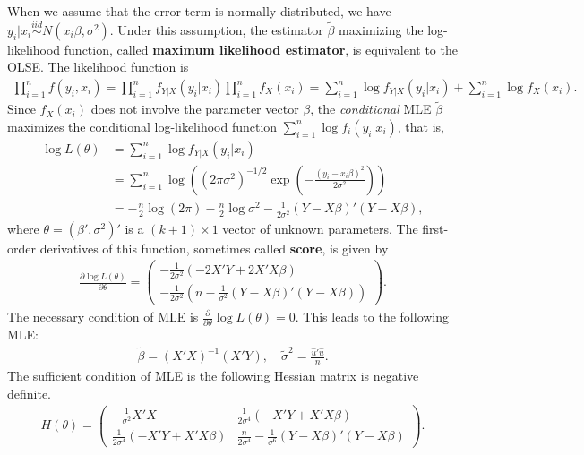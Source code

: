 \documentclass[
  12pt,
]{article}
\begin{document}
When we assume that the error term is normally distributed, we have \(y_i | x_i \overset{iid}{\sim} N(x_i \beta, \sigma^2)\).
Under this assumption, the estimator \(\tilde{\beta}\) maximizing the log-likelihood function, called \textbf{maximum likelihood estimator},
is equivalent to the OLSE.
The likelihood function is
\begin{align*}
  \prod_{i=1}^n f(y_i, x_i)
  = \prod_{i=1}^n f_{Y|X}(y_i | x_i) \prod_{i=1}^n f_X(x_i)
  = \sum_{i=1}^n \log f_{Y|X}(y_i | x_i) + \sum_{i=1}^n \log f_X(x_i).
\end{align*}
Since \(f_X(x_i)\) does not involve the parameter vector \(\beta\),
the \emph{conditional} MLE \(\tilde{\beta}\) maximizes the conditional log-likelihood function \(\sum_{i=1}^n \log f_i(y_i | x_i)\), that is,
\begin{align*}
  \log L(\theta) 
  &= \sum_{i=1}^n \log f_{Y|X}(y_i | x_i)  \\
  &= \sum_{i=1}^n \log \left( (2\pi\sigma^2)^{-1/2} \exp\left( -\frac{(y_i - x_i \beta)^2}{2\sigma^2} \right) \right)  \\
  &= -\frac{n}{2} \log (2\pi) -\frac{n}{2}\log\sigma^2 -\frac{1}{2\sigma^2} (Y - X \beta)'(Y - X \beta),
\end{align*}
where \(\theta = (\beta', \sigma^2)'\) is a \((k + 1) \times 1\) vector of unknown parameters.
The first-order derivatives of this function, sometimes called \textbf{score}, is given by
\begin{align*}
  \frac{\partial \log L(\theta)}{\partial \theta} =
  \begin{pmatrix}
    -\frac{1}{2\sigma^2} (-2X'Y + 2X'X \beta) \\
    -\frac{1}{2\sigma^2} \left(n - \frac{1}{\sigma^2} (Y - X \beta)'(Y - X \beta) \right)
  \end{pmatrix}.
\end{align*}
The necessary condition of MLE is \(\frac{\partial}{\partial \theta} \log L(\theta) = 0\).
This leads to the following MLE:
\begin{align*}
  \tilde{\beta} = (X'X)^{-1}(X'Y),\quad \tilde{\sigma}^2 = \frac{\hat{u}'\hat{u}}{n}.
\end{align*}
The sufficient condition of MLE is the following Hessian matrix is negative definite.
\begin{align*}
  H(\theta) =
  \begin{pmatrix}
    -\frac{1}{\sigma^2} X'X  & \frac{1}{2\sigma^4} (-X'Y + X'X \beta) \\
    \frac{1}{2\sigma^4} (-X'Y + X'X \beta) & \frac{n}{2\sigma^4} - \frac{1}{\sigma^6} (Y - X \beta)'(Y - X \beta)
  \end{pmatrix}.
\end{align*}
\end{document}
